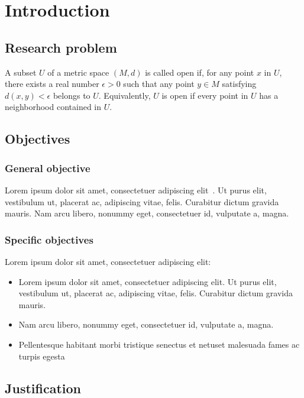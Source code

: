 \chapter{Introduction}\label{ch:Introduction}
\lipsum[1]

\section{Research problem}
\lipsum[1]
\begin{definition}
A subset $U$ of a metric space $(M, d)$ is called open if, for any point $x$ in $U$, there exists a real number $\epsilon > 0$ such that any point $y\in M$ satisfying $d(x, y) < \epsilon$ belongs to $U$. Equivalently, $U$ is open if every point in $U$ has a neighborhood contained in $U$.
\end{definition}
\lipsum[1]

\section{Objectives}
\subsection{General objective}
Lorem ipsum dolor sit amet, consectetuer adipiscing elit~\cite{adam2015higgs, atlas2014neural, baldi2014searching}. Ut purus elit, vestibulum ut, placerat ac, adipiscing vitae, felis. Curabitur dictum gravida mauris. Nam arcu libero, nonummy eget, consectetuer id, vulputate a, magna.

\subsection{Specific objectives}
Lorem ipsum dolor sit amet, consectetuer adipiscing elit:
\begin{itemize}
    \item Lorem ipsum dolor sit amet, consectetuer adipiscing elit. Ut purus elit, vestibulum ut, placerat ac, adipiscing vitae, felis. Curabitur dictum gravida mauris.
    \item Nam arcu libero, nonummy eget, consectetuer id, vulputate a, magna.
    \item  Pellentesque habitant morbi tristique senectus et netuset malesuada fames ac turpis egesta
\end{itemize}

\section{Justification}
\lipsum[1]

